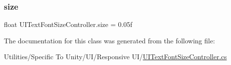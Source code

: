\subsubsection{\texorpdfstring{size}{size}}
{\footnotesize\ttfamily float U\+I\+Text\+Font\+Size\+Controller.\+size = 0.\+05f}



The documentation for this class was generated from the following file\+:\begin{DoxyCompactItemize}
\item 
Utilities/\+Specific To Unity/\+U\+I/\+Responsive U\+I/\hyperlink{_u_i_text_font_size_controller_8cs}{U\+I\+Text\+Font\+Size\+Controller.\+cs}\end{DoxyCompactItemize}
